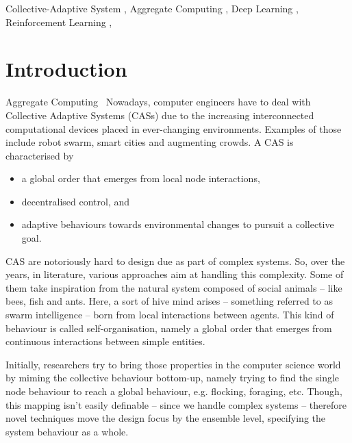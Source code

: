 \documentclass[
twocolumn,
]{ceurart}
\begin{document}
\begin{keywords}
  Collective-Adaptive System \sep
  Aggregate Computing \sep
  Deep Learning \sep
  Reinforcement Learning \sep
\end{keywords}

\maketitle
{}
\section{Introduction}
Aggregate Computing~\cite{DBLP:journals/computer/BealPV15}
Nowadays, computer engineers have to deal with Collective Adaptive Systems (CASs) due to the increasing interconnected computational devices placed in ever-changing environments.
 Examples of those include robot swarm, smart cities and augmenting crowds.
A CAS is characterised by 
\begin{itemize}
\item a global order that emerges from local node interactions, 
\item  decentralised control, and 
\item adaptive behaviours towards environmental changes to pursuit a collective goal.
\end{itemize}
CAS are notoriously hard to design due as part of complex systems. 
%
So, over the years, in literature, various approaches aim at handling this complexity. 
%
Some of them take inspiration from the natural system composed of social animals -- like bees, fish and ants. 
%
Here, a sort of hive mind arises -- something referred to as swarm intelligence -- born from local interactions between agents. 
%
This kind of behaviour is called self-organisation, namely a global order that emerges from continuous interactions between simple entities.

Initially, researchers try to bring those properties in the computer science world by miming the collective behaviour bottom-up, 
 namely trying to find the single node behaviour to reach a global behaviour, e.g. flocking, foraging, etc.
%
Though, this mapping isn't easily definable -- since we handle complex systems -- therefore novel techniques move the design focus by the ensemble level,
 specifying the system behaviour as a whole. 
\end{document}
